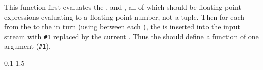 \documentclass[oneside]{book}
\begin{document}

\begin{function}{\fpStepInline}
\begin{syntax}
    
\end{syntax}
This function first evaluates the , 
and , all of which should be floating point
expressions evaluating to a floating point number, not a tuple.
Then for each  from the  to the
 in turn (using  between each
), the  is inserted into the input stream
with \verb|#1| replaced by the current . Thus the
 should define a function of one argument (\verb|#1|).
\begin{demohigh}
\IgnoreSpacesOn
\tlClear \lTmpaTl
{} {0.1} {1.5} {
  \tlPutRight \lTmpaTl {[#1]}
}
\tlUse \lTmpaTl
\IgnoreSpacesOff
\end{demohigh}
\end{function}
\end{document}
